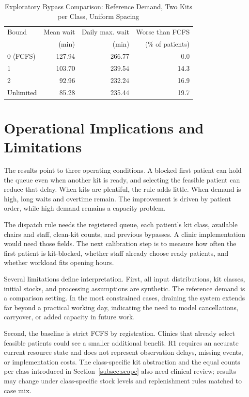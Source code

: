\documentclass[conference]{IEEEtran}
\begin{document}
\begin{table}[t]
\caption{Exploratory Bypass Comparison: Reference Demand, Two Kits per Class, Uniform Spacing}
\label{tab:fairness}
\centering\footnotesize
\begin{tabular}{@{}lrrr@{}}
\toprule
Bound & Mean wait & Daily max. wait & Worse than FCFS \\
 & (min) & (min) & (\% of patients) \\
\midrule
0 (FCFS) & 127.94 & 266.77 & 0.0 \\
1 & 103.70 & 239.54 & 14.3 \\
2 & 92.96 & 232.24 & 16.9 \\
Unlimited & 85.28 & 235.44 & 19.7 \\
\bottomrule
\end{tabular}
\end{table}

\section{Operational Implications and Limitations}
The results point to three operating conditions. A blocked first patient can hold the queue even when another kit is ready, and selecting the feasible patient can reduce that delay. When kits are plentiful, the rule adds little. When demand is high, long waits and overtime remain. The improvement is driven by patient order, while high demand remains a capacity problem.

The dispatch rule needs the registered queue, each patient's kit class, available chairs and staff, clean-kit counts, and previous bypasses. A clinic implementation would need those fields. The next calibration step is to measure how often the first patient is kit-blocked, whether staff already choose ready patients, and whether workload fits opening hours.

Several limitations define interpretation. First, all input distributions, kit classes, initial stocks, and processing assumptions are synthetic. The reference demand is a comparison setting. In the most constrained cases, draining the system extends far beyond a practical working day, indicating the need to model cancellations, carryover, or added capacity in future work.

Second, the baseline is strict FCFS by registration. Clinics that already select feasible patients could see a smaller additional benefit. R1 requires an accurate current resource state and does not represent observation delays, missing events, or implementation costs. The class-specific kit abstraction and the equal counts per class introduced in Section~\ref{subsec:scope} also need clinical review; results may change under class-specific stock levels and replenishment rules matched to case mix.
\end{document}
